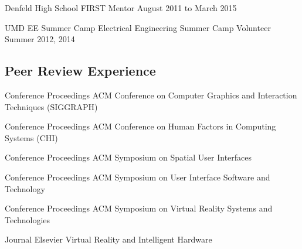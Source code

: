 \begin{cventries}
  \cventry
    {Denfeld High School} %
    {FIRST Mentor} %
    {August 2011 to March 2015} %
    {} %
    {}
    \vspace{-0.15in}
    
  \cventry
    {UMD EE Summer Camp} %
    {Electrical Engineering Summer Camp Volunteer} %
    {Summer 2012, 2014} %
    {} %
    {}
    \vspace{-0.15in}
    
    

  \vspace{-.25cm}
  \subsection*{Peer Review Experience}
  
  \cventry
    {Conference Proceedings} %
    {ACM Conference on Computer Graphics and Interaction Techniques (SIGGRAPH)} %
    {} %
    {} %
    {}
    \vspace{-0.15in}
  
  \cventry
    {Conference Proceedings} %
    {ACM Conference on Human Factors in Computing Systems (CHI)} %
    {} %
    {} %
    {}
    \vspace{-0.15in}
    
  \cventry
    {Conference Proceedings} %
    {ACM Symposium on Spatial User Interfaces} %
    {} %
    {} %
    {}
    \vspace{-0.15in}
    
  \cventry
    {Conference Proceedings} %
    {ACM Symposium on User Interface Software and Technology} %
    {} %
    {} %
    {}
    \vspace{-0.15in}
    
  \cventry
    {Conference Proceedings} %
    {ACM Symposium on Virtual Reality Systems and Technologies} %
    {} %
    {} %
    {}
    \vspace{-0.15in}
    
  \cventry
    {Journal} %
    {Elsevier Virtual Reality and Intelligent Hardware} %
    {} %
    {} %
    {}
    \vspace{-0.15in}
    

\end{cventries}
